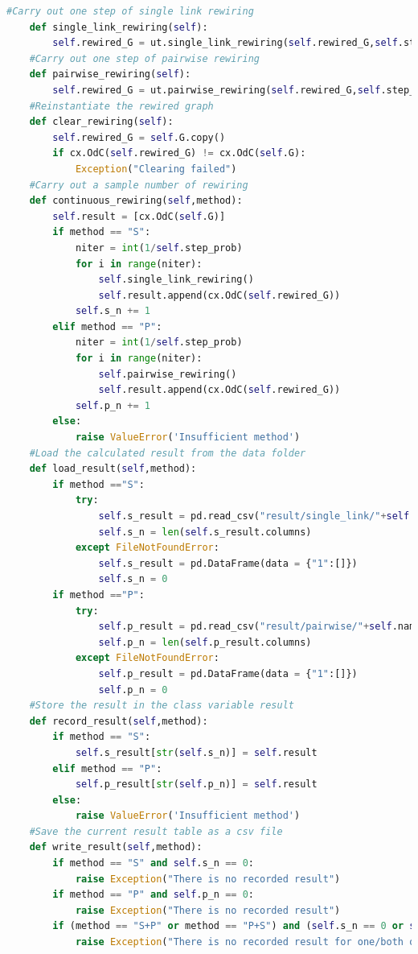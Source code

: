 \documentclass[12pt]{article}
\begin{document}
\begin{lstlisting}[breaklines=true,language=Python]
    #Carry out one step of single link rewiring
    def single_link_rewiring(self):
        self.rewired_G = ut.single_link_rewiring(self.rewired_G,self.step_prob)
    #Carry out one step of pairwise rewiring
    def pairwise_rewiring(self):
        self.rewired_G = ut.pairwise_rewiring(self.rewired_G,self.step_prob)
    #Reinstantiate the rewired graph
    def clear_rewiring(self):
        self.rewired_G = self.G.copy()
        if cx.OdC(self.rewired_G) != cx.OdC(self.G):
            Exception("Clearing failed")
    #Carry out a sample number of rewiring
    def continuous_rewiring(self,method):
        self.result = [cx.OdC(self.G)]
        if method == "S":
            niter = int(1/self.step_prob)
            for i in range(niter):
                self.single_link_rewiring()
                self.result.append(cx.OdC(self.rewired_G))
            self.s_n += 1
        elif method == "P":
            niter = int(1/self.step_prob)
            for i in range(niter):
                self.pairwise_rewiring()
                self.result.append(cx.OdC(self.rewired_G))
            self.p_n += 1
        else:
            raise ValueError('Insufficient method')
    #Load the calculated result from the data folder
    def load_result(self,method):
        if method =="S":
            try:
                self.s_result = pd.read_csv("result/single_link/"+self.name+".csv")
                self.s_n = len(self.s_result.columns)
            except FileNotFoundError:
                self.s_result = pd.DataFrame(data = {"1":[]})
                self.s_n = 0
        if method =="P":
            try:
                self.p_result = pd.read_csv("result/pairwise/"+self.name+".csv")
                self.p_n = len(self.p_result.columns)
            except FileNotFoundError:
                self.p_result = pd.DataFrame(data = {"1":[]})
                self.p_n = 0
    #Store the result in the class variable result
    def record_result(self,method):
        if method == "S":
            self.s_result[str(self.s_n)] = self.result
        elif method == "P":
            self.p_result[str(self.p_n)] = self.result
        else:
            raise ValueError('Insufficient method')
    #Save the current result table as a csv file
    def write_result(self,method):
        if method == "S" and self.s_n == 0:
            raise Exception("There is no recorded result")
        if method == "P" and self.p_n == 0:
            raise Exception("There is no recorded result")
        if (method == "S+P" or method == "P+S") and (self.s_n == 0 or self.p_n==0):
            raise Exception("There is no recorded result for one/both of the methods.")
        

\end{lstlisting}
\end{document}
